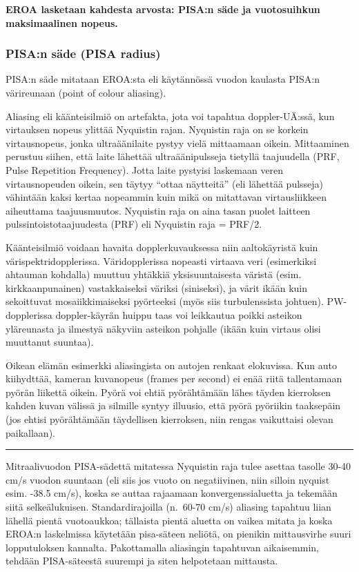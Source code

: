 \documentclass[
]{book}
\begin{document}
\textbf{EROA lasketaan kahdesta arvosta: PISA:n säde ja vuotosuihkun maksimaalinen nopeus.}

\subsubsection{PISA:n säde (PISA radius)}\label{pisan-suxe4de-pisa-radius}

PISA:n säde mitataan EROA:sta eli käytännössä vuodon kaulasta PISA:n värireunaan (point of colour aliasing).

Aliasing eli käänteisilmiö on artefakta, jota voi tapahtua doppler-UÄ:ssä, kun virtauksen nopeus ylittää Nyquistin rajan. Nyquistin raja on se korkein virtausnopeus, jonka ultraäänilaite pystyy vielä mittaamaan oikein. Mittaaminen perustuu siihen, että laite lähettää ultraäänipulsseja tietyllä taajuudella (PRF, Pulse Repetition Frequency). Jotta laite pystyisi laskemaan veren virtausnopeuden oikein, sen täytyy ``ottaa näytteitä'' (eli lähettää pulsseja) vähintään kaksi kertaa nopeammin kuin mikä on mitattavan virtausliikkeen aiheuttama taajuusmuutos. Nyquistin raja on aina tasan puolet laitteen pulssintoistotaajuudesta (PRF) eli Nyquistin raja = PRF/2.

Käänteisilmiö voidaan havaita dopplerkuvauksessa niin aaltokäyristä kuin värispektridopplerissa. Väridopplerissa nopeasti virtaava veri (esimerkiksi ahtauman kohdalla) muuttuu yhtäkkiä yksisuuntaisesta väristä (esim. kirkkaanpunainen) vastakkaiseksi väriksi (siniseksi), ja värit ikään kuin sekoittuvat mosaiikkimaiseksi pyörteeksi (myös siis turbulenssista johtuen). PW-dopplerissa doppler-käyrän huippu taas voi leikkautua poikki asteikon yläreunasta ja ilmestyä näkyviin asteikon pohjalle (ikään kuin virtaus olisi muuttanut suuntaa).

Oikean elämän esimerkki aliasingista on autojen renkaat elokuvissa. Kun auto kiihydttää, kameran kuvanopeus (frames per second) ei enää riitä tallentamaan pyörän liikettä oikein. Pyörä voi ehtiä pyörähtämään lähes täyden kierroksen kahden kuvan välissä ja silmille syntyy illuusio, että pyörä pyöriikin taaksepäin (jos ehtisi pyörähtämään täydellisen kierroksen, niin rengas vaikuttaisi olevan paikallaan).

\begin{center}\rule{0.5\linewidth}{0.5pt}\end{center}

Mitraalivuodon PISA-sädettä mitatessa Nyquistin raja tulee asettaa tasolle 30-40 cm/s vuodon suuntaan (eli siis jos vuoto on negatiivinen, niin silloin nyquist esim. -38.5 cm/s), koska se auttaa rajaamaan konvergenssialuetta ja tekemään siitä selkeälukuisen. Standardirajoilla (n.~60-70 cm/s) aliasing tapahtuu liian lähellä pientä vuotoaukkoa; tällaista pientä aluetta on vaikea mitata ja koska EROA:n laskelmissa käytetään pisa-säteen neliötä, on pienikin mittausvirhe suuri lopputuloksen kannalta. Pakottamalla aliasingin tapahtuvan aikaisemmin, tehdään PISA-säteestä suurempi ja siten helpotetaan mittausta.
\end{document}
